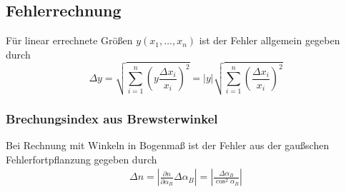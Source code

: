 \label{anhang}

\subsection{Fehlerrechnung}
Für linear errechnete Größen $ y(x_1, \dots, x_n) $ ist der Fehler allgemein gegeben durch
\begin{equation}
	\Delta y = \sqrt{\sum_{i=1}^{n}\left(y\frac{\Delta x_i}{x_i}\right)^2} 
		= |y|\sqrt{\sum_{i=1}^{n}\left(\frac{\Delta x_i}{x_i}\right)^2}  \label{eq:err}
\end{equation}
\subsubsection{Brechungsindex aus Brewsterwinkel}
Bei Rechnung mit Winkeln in Bogenmaß ist der Fehler aus der gaußschen Fehlerfortpflanzung gegeben durch
\begin{align}
	\Delta n = \left|\frac{\partial n}{\partial \alpha_B}\Delta \alpha_B\right| 
	=  \left|\frac{\Delta\alpha_B}{\cos^2\alpha_B}\right| \label{eq:err:brew}
\end{align}


%
%
